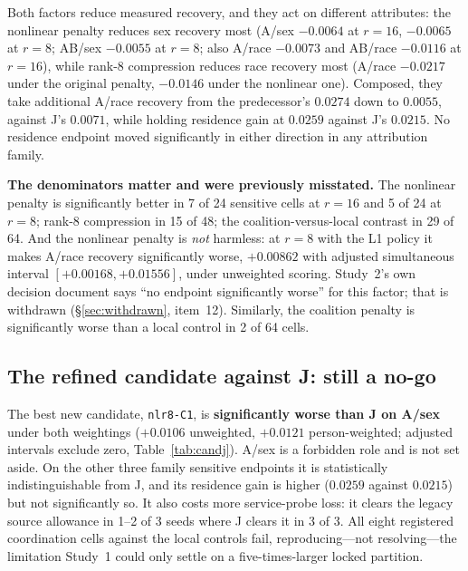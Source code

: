 \documentclass[10pt]{article}
\begin{document}
Both factors reduce measured recovery, and they act on different attributes: the nonlinear penalty
reduces sex recovery most (A/sex $-0.0064$ at $r=16$, $-0.0065$ at $r=8$; AB/sex $-0.0055$ at
$r=8$; also A/race $-0.0073$ and AB/race $-0.0116$ at $r=16$), while rank-8 compression reduces race
recovery most (A/race $-0.0217$ under the original penalty, $-0.0146$ under the nonlinear one).
Composed, they take additional A/race recovery from the predecessor's $0.0274$ down to $0.0055$,
against J's $0.0071$, while holding residence gain at $0.0259$ against J's $0.0215$. No residence
endpoint moved significantly in either direction in any attribution family.

\textbf{The denominators matter and were previously misstated.} The nonlinear penalty is
significantly better in 7 of 24 sensitive cells at $r=16$ and 5 of 24 at $r=8$; rank-8 compression
in 15 of 48; the coalition-versus-local contrast in 29 of 64. And the nonlinear penalty is
\emph{not} harmless: at $r=8$ with the L1 policy it makes A/race recovery significantly worse,
$+0.00862$ with adjusted simultaneous interval
$[+0.00168,+0.01556]$, under unweighted scoring. Study~2's own
decision document says ``no endpoint significantly worse'' for this factor; that is withdrawn
(\S\ref{sec:withdrawn}, item~12). Similarly, the coalition penalty is significantly worse than a
local control in 2 of 64 cells.

\subsection{The refined candidate against J: still a no-go}

\begin{table}[t]
\centering\small

\caption{The best new candidate, \texttt{nlr8-C1}, against the frozen neural channel J on 2018
development data. Two of eight sensitive cells are significantly worse; none is better; the
residence advantage is positive in point estimate and not significant.}
\label{tab:candj}
\end{table}

The best new candidate, \texttt{nlr8-C1}, is \textbf{significantly worse than J on A/sex} under both
weightings ($+0.0106$ unweighted, $+0.0121$ person-weighted; adjusted intervals exclude zero,
Table~\ref{tab:candj}). A/sex is a forbidden role and is not set aside. On the other three family sensitive endpoints it is
statistically indistinguishable from J, and its residence gain is higher ($0.0259$ against $0.0215$)
but not significantly so. It also costs more service-probe loss: it clears the legacy source
allowance in 1--2 of 3 seeds where J clears it in 3 of 3. All eight registered coordination cells
against the local controls fail, reproducing---not resolving---the limitation Study~1 could only
settle on a five-times-larger locked partition.
\end{document}
